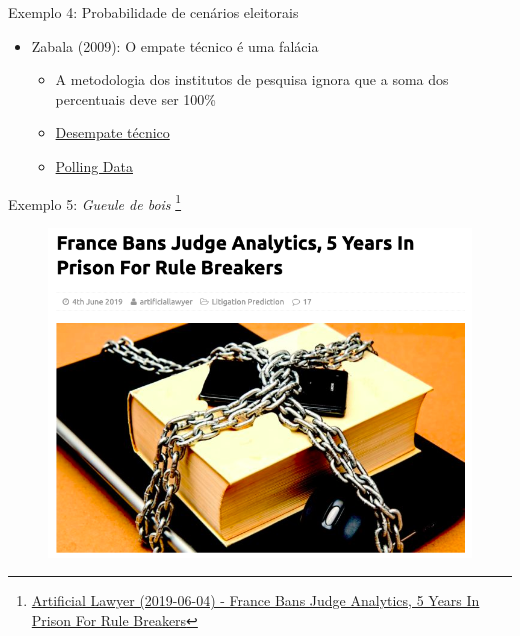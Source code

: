 \documentclass{beamer}
\newcommand\blfootnote[1]{%
  \begingroup
  \renewcommand\thefootnote{}\footnote{#1}%
  \addtocounter{footnote}{-1}%
  \endgroup
}
\begin{document}
\begin{frame}{Exemplo 4: Probabilidade de cenários eleitorais}
\begin{itemize}
\item Zabala (2009): O empate técnico é uma falácia
  \begin{itemize}
  \pause
  \item A metodologia dos institutos de pesquisa ignora que a soma dos percentuais deve ser 100\%
  \pause
  \item \href{http://www.filipezabala.com/cursos/dt.html}{Desempate técnico}
  \pause
  \item \href{http://www.pollingdata.com.br/}{Polling Data}
  \end{itemize}
\end{itemize}
\end{frame}

\begin{frame}{Exemplo 5: \textit{Gueule de bois}}
\blfootnote{\tiny{\href{https://www.artificiallawyer.com/2019/06/04/france-bans-judge-analytics-5-years-in-prison-for-rule-breakers/}{Artificial Lawyer (2019-06-04) - France Bans Judge Analytics, 5 Years In Prison For Rule Breakers}}}
\begin{figure}
\includegraphics[scale=0.35]{franca}
\end{figure}
\end{frame}
\end{document}
